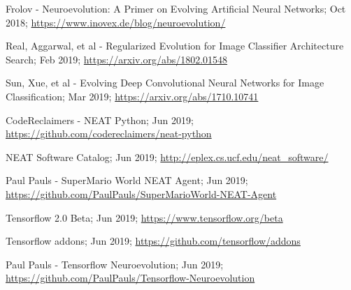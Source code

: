 \documentclass[journal, a4paper]{IEEEtran}
\begin{document}
\begin{thebibliography}{5}
    Frolov - Neuroevolution: A Primer on Evolving Artificial Neural Networks; Oct 2018;
    \url{https://www.inovex.de/blog/neuroevolution/}

    Real, Aggarwal, et al - Regularized Evolution for Image Classifier Architecture Search; Feb 2019;
    \url{https://arxiv.org/abs/1802.01548}

    Sun, Xue, et al - Evolving Deep Convolutional Neural Networks for Image Classification; Mar 2019;
    \url{https://arxiv.org/abs/1710.10741}

    CodeReclaimers - NEAT Python; Jun 2019;
    \url{https://github.com/codereclaimers/neat-python}

    NEAT Software Catalog; Jun 2019;
    \url{http://eplex.cs.ucf.edu/neat_software/}

    Paul Pauls - SuperMario World NEAT Agent; Jun 2019;
    \url{https://github.com/PaulPauls/SuperMarioWorld-NEAT-Agent}

    Tensorflow 2.0 Beta; Jun 2019;
    \url{https://www.tensorflow.org/beta}

    Tensorflow addons; Jun 2019;
    \url{https://github.com/tensorflow/addons}

    Paul Pauls - Tensorflow Neuroevolution; Jun 2019;
    \url{https://github.com/PaulPauls/Tensorflow-Neuroevolution}

\end{thebibliography}
\end{document}
